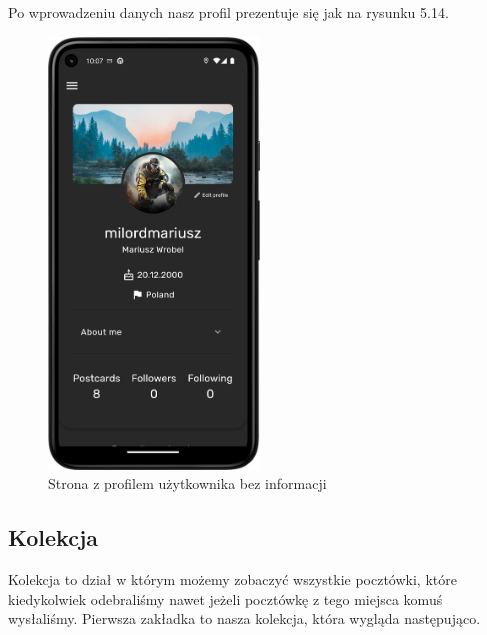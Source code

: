 \documentclass[a4paper,twoside,12pt]{book}
\begin{document}
Po wprowadzeniu danych nasz profil prezentuje się jak na rysunku 5.14.

\begin{figure}[H]
    \centering
    \includegraphics[width=0.5\textwidth]{mobile_ss/profil_z_info.png}
    \caption{Strona z profilem użytkownika bez informacji}
\end{figure}

\subsection{Kolekcja}
Kolekcja to dział w którym możemy zobaczyć wszystkie pocztówki, które kiedykolwiek odebraliśmy nawet jeżeli pocztówkę z tego miejsca komuś wysłaliśmy. Pierwsza zakładka to nasza kolekcja, która wygląda następująco. 
\end{document}
